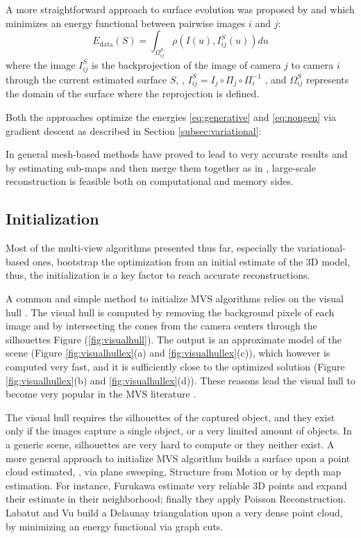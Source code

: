 A more straightforward approach to surface evolution was proposed by \cite{hiep2009towards} and \cite{vu2011large} which minimizes an energy functional between pairwise images $i$ and $j$:
\begin{equation}
\label{eq:nongen}
  E_{\text{data}}(S) = \int_{\Omega^{\mathit{S}}_{ij}} \rho\left(I(\mathit{u}), I^{\mathit{S}}_{ij}(\mathit{u})\right) d\mathit{u}
\end{equation}
where the image $I^{\mathit{S}}_{ij}$ is the backprojection of the image of camera $j$ to camera $i$ through the current estimated surface $\mathit{S}$, \ie, $I^{\mathit{S}}_{ij} = I_j \circ \Pi_j \circ \Pi_i^{-1}$ , and $\Omega^{\mathit{S}}_{ij}$ represents the domain of the surface where the reprojection is defined.

Both the approaches optimize the energies \eqref{eq:generative} and \eqref{eq:nongen} via gradient descent as described in Section \ref{subsec:variational}:

In general mesh-based methods have proved to lead to very accurate results and  by estimating  sub-maps and then merge them together as in \cite{vu2011large},  large-scale reconstruction is feasible both on computational and memory sides.


\subsection{Initialization}
Most of the  multi-view algorithms presented thus far, especially the variational-based ones, bootstrap the optimization from an initial estimate of the 3D model, thus, the initialization is a key factor to reach accurate reconstructions.

A common and simple method to initialize MVS algorithms relies on the visual hull \cite{laurentini1994visual}. 
The visual hull is computed by removing the background pixels of each image and by intersecting the cones from the camera centers through the silhouettes Figure (\ref{fig:visualhull}). 
The output is an approximate model of the scene (Figure \ref{fig:visualhullex}(a) and \ref{fig:visualhullex}(c)), which however is computed very fast, and it is sufficiently close to the optimized solution (Figure \ref{fig:visualhullex}(b) and \ref{fig:visualhullex}(d)). These reasons lead the visual hull to become very popular in the MVS literature \cite{jin2002variational,soatto2003tales,zaharescu2007transformesh,yoon2010joint}.

The visual hull requires the silhouettes of the captured object, and they exist only if the images capture a single object, or a very limited amount of objects.
In a generic scene, silhouettes are very hard to compute or they neither exist.
A more general approach to initialize MVS algorithm builds a surface upon a point cloud estimated, \eg, via plane sweeping, Structure from Motion or by depth map estimation.
For instance, Furukawa \etal \cite{fu10} estimate very reliable 3D points and expand their estimate in their neighborhood; finally they apply Poisson Reconstruction. 
Labatut \etal \cite{labatut2007efficient} and Vu \etal \cite{vu_et_al_2012} build a Delaunay triangulation upon a very dense point cloud, by minimizing an energy functional via graph cuts.



